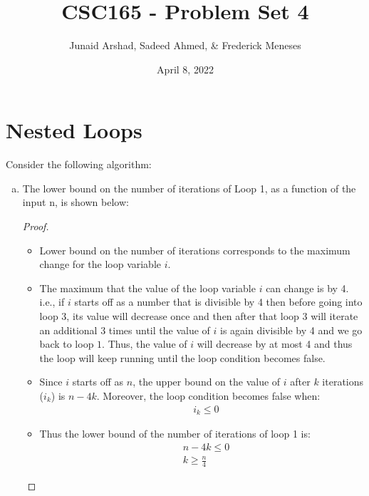 \documentclass[12pt]{article}
\title{CSC165 - Problem Set 4}
\author{Junaid Arshad, Sadeed Ahmed, \& Frederick Meneses}
\date{April 8, 2022}
\theoremstyle{definition}
\begin{document}
\maketitle
\section{Nested Loops}
Consider the following algorithm:

\begin{enumerate}[(a)]
    \item The lower bound on the number of iterations of Loop 1, as a function of the input n, is shown below:
        \begin{proof}
        
        \begin{itemize}
            \item Lower bound on the number of iterations corresponds to the maximum change for the loop variable $i$.
            \item The maximum that the value of the loop variable $i$ can change is by 4. i.e., if $i$ starts off as a number that is divisible by 4 then before going into loop 3, its value will decrease once and then after that loop 3 will iterate an additional 3 times until the value of $i$ is again divisible by 4 and we go back to loop $1$. Thus, the value of $i$ will decrease by at most 4 and thus the loop will keep running until the loop condition becomes false.
            \item Since $i$ starts off as $n$, the upper bound on the value of $i$ after $k$ iterations ($i_k$) is $n-4 k$. Moreover, the loop condition becomes false when:
            \begin{align*}
                &i_{k} \leq 0
            \end{align*}
            \item Thus the lower bound of the number of iterations of loop 1 is:
            \begin{align*}
                &n-4 k \leq 0 \\
                &k \geqslant \frac{n}{4} 
            \end{align*}
        \end{itemize}
        \end{proof}
    

\end{enumerate}
\end{document}
